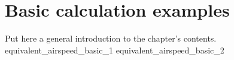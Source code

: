 \documentclass[[12pt,twoside]{book}
\begin{document}
%
%
\chapter%
   [Basic calculation examples]%
   {Basic calculation examples}
\label{chap:Basics}

\setcounter{minitocdepth}{2}%
\minitoc %

\vspace{\baselineskip}

\noindent
Put here a general introduction to the chapter's contents.
%
{equivalent_airspeed_basic_1}
{equivalent_airspeed_basic_2}
\end{document}

